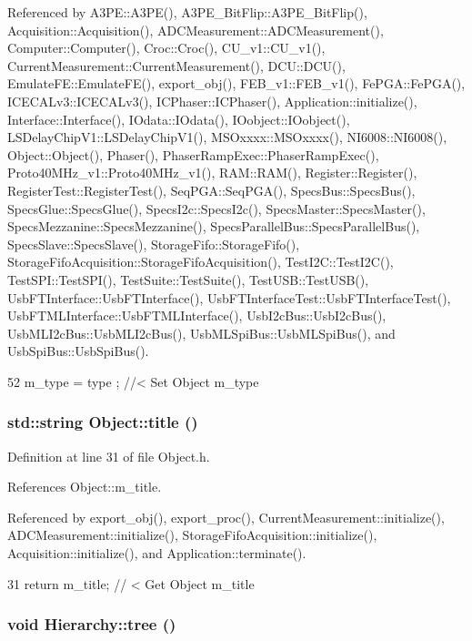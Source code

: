 Referenced by A3PE::A3PE(), A3PE\_\-BitFlip::A3PE\_\-BitFlip(), Acquisition::Acquisition(), ADCMeasurement::ADCMeasurement(), Computer::Computer(), Croc::Croc(), CU\_\-v1::CU\_\-v1(), CurrentMeasurement::CurrentMeasurement(), DCU::DCU(), EmulateFE::EmulateFE(), export\_\-obj(), FEB\_\-v1::FEB\_\-v1(), FePGA::FePGA(), ICECALv3::ICECALv3(), ICPhaser::ICPhaser(), Application::initialize(), Interface::Interface(), IOdata::IOdata(), IOobject::IOobject(), LSDelayChipV1::LSDelayChipV1(), MSOxxxx::MSOxxxx(), NI6008::NI6008(), Object::Object(), Phaser(), PhaserRampExec::PhaserRampExec(), Proto40MHz\_\-v1::Proto40MHz\_\-v1(), RAM::RAM(), Register::Register(), RegisterTest::RegisterTest(), SeqPGA::SeqPGA(), SpecsBus::SpecsBus(), SpecsGlue::SpecsGlue(), SpecsI2c::SpecsI2c(), SpecsMaster::SpecsMaster(), SpecsMezzanine::SpecsMezzanine(), SpecsParallelBus::SpecsParallelBus(), SpecsSlave::SpecsSlave(), StorageFifo::StorageFifo(), StorageFifoAcquisition::StorageFifoAcquisition(), TestI2C::TestI2C(), TestSPI::TestSPI(), TestSuite::TestSuite(), TestUSB::TestUSB(), UsbFTInterface::UsbFTInterface(), UsbFTInterfaceTest::UsbFTInterfaceTest(), UsbFTMLInterface::UsbFTMLInterface(), UsbI2cBus::UsbI2cBus(), UsbMLI2cBus::UsbMLI2cBus(), UsbMLSpiBus::UsbMLSpiBus(), and UsbSpiBus::UsbSpiBus().


\begin{DoxyCode}
52 { m_type  = type  ; } //< Set Object m_type
\end{DoxyCode}
\hypertarget{classObject_a73a0f1a41828fdd8303dd662446fb6c3}{
\subsubsection[{title}]{\setlength{\rightskip}{0pt plus 5cm}std::string Object::title ()}}
\label{classObject_a73a0f1a41828fdd8303dd662446fb6c3}


Definition at line 31 of file Object.h.

References Object::m\_\-title.

Referenced by export\_\-obj(), export\_\-proc(), CurrentMeasurement::initialize(), ADCMeasurement::initialize(), StorageFifoAcquisition::initialize(), Acquisition::initialize(), and Application::terminate().


\begin{DoxyCode}
31 { return m_title;      } // < Get Object m_title
\end{DoxyCode}
\hypertarget{classHierarchy_a594c294c5f60c230e106d522ed008212}{
\subsubsection[{tree}]{\setlength{\rightskip}{0pt plus 5cm}void Hierarchy::tree ()}}
\label{classHierarchy_a594c294c5f60c230e106d522ed008212}


